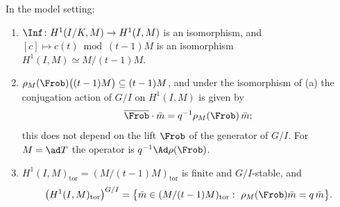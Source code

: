 \begin{proposition}\label{prop:cohomology:frob-h1}
In the model setting:
\begin{enumerate}[label=(\alph*)]
\item $\Inf\colon H^1(I/K,M)\to H^1(I,M)$ is an isomorphism, and $[c]\mapsto c(t)\bmod(t-1)M$ is an isomorphism $H^1(I,M)\simeq M/(t-1)M$.
\item $\rho_M(\Frob)\bigl((t-1)M\bigr)\subseteq(t-1)M$, and under the isomorphism of (a) the conjugation action of $G/I$ on $H^1(I,M)$ is given by
\[
\overline{\Frob}\cdot\bar m=q^{-1}\rho_M(\Frob)\,\bar m ;
\]
this does not depend on the lift $\Frob$ of the generator of $G/I$. For $M=\ad T$ the operator is $q^{-1}\Ad\rho(\Frob)$.
\item $H^1(I,M)_{\mathrm{tor}}=(M/(t-1)M)_{\mathrm{tor}}$ is finite and $G/I$-stable, and
\[
\bigl(H^1(I,M)_{\mathrm{tor}}\bigr)^{G/I}=\bigl\{\bar m\in(M/(t-1)M)_{\mathrm{tor}}:\ \rho_M(\Frob)\bar m=q\,\bar m\bigr\}.
\]
\end{enumerate}
\end{proposition}

